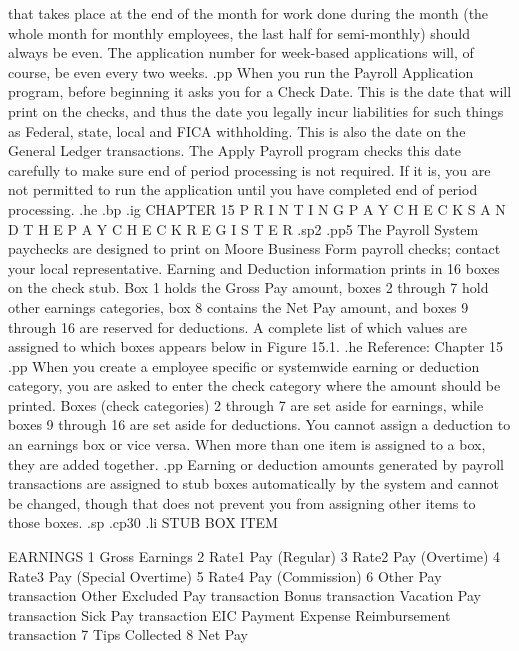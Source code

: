 that takes place at the end of the month for
work done during the month (the whole month for
monthly employees, the last half for semi-monthly) should always be even.
The application number for week-based applications will, of course,
be even every two weeks.
.pp
When you run the Payroll Application program, before beginning it asks
you for a Check Date.  This is the date that will print on the checks,
and thus the date you legally incur liabilities for such things as
Federal, state, local and FICA withholding.  This is also the date
on the General Ledger transactions.  The Apply Payroll program
checks this date carefully to make sure end of period processing
is not required. If it is, you are not permitted to run the application
until you have completed end of period processing.
.he
.bp
.ig
CHAPTER 15
P R I N T I N G    P A Y C H E C K S
A N D	 T H E	  P A Y C H E C K    R E G I S T E R
.sp2
.pp5
The Payroll System paychecks are designed to print on Moore Business
Form payroll checks; contact your local representative.
Earning and Deduction information
prints in 16 boxes on the check stub. Box 1 holds the Gross Pay amount,
boxes 2 through 7 hold other earnings categories, box 8 contains the
Net Pay amount, and boxes 9 through 16 are reserved for deductions.
A complete list of which values are assigned to which boxes appears
below in Figure 15.1.
.he Reference: Chapter 15
.pp
When you create a employee specific or systemwide earning or deduction
category, you are asked to enter the check category where the amount
should be printed. Boxes (check categories) 2 through 7 are set aside
for earnings, while boxes 9 through 16 are set aside for deductions.
You cannot assign a deduction to an earnings box or vice versa.
When more than one item is assigned to a box, they are added together.
.pp
Earning or deduction amounts generated by payroll
transactions are assigned to stub boxes automatically by the system
and cannot be changed, though that does not prevent you from assigning
other items to those boxes.
.sp
.cp30
.li
	  STUB BOX		 ITEM

 EARNINGS    1		     Gross Earnings
	     2		     Rate1 Pay (Regular)
	     3		     Rate2 Pay (Overtime)
	     4		     Rate3 Pay (Special Overtime)
	     5		     Rate4 Pay (Commission)
	     6		     Other Pay transaction
			     Other Excluded Pay transaction
			     Bonus transaction
			     Vacation Pay transaction
			     Sick Pay transaction
			     EIC Payment
			     Expense Reimbursement transaction
	     7		     Tips Collected
	     8		     Net Pay

